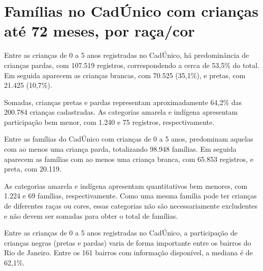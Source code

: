 \section{Famílias no CadÚnico com crianças até 72 meses, por raça/\allowbreak{}cor}


Entre as crianças de 0 a 5 anos registradas no CadÚnico, há predominância de crianças pardas, com 107.519 registros, correspondendo a cerca de 53,5\% do total. Em seguida aparecem as crianças brancas, com 70.525 (35,1\%), e pretas, com 21.425 (10,7\%).

Somadas, crianças pretas e pardas representam aproximadamente 64,2\% das 200.784 crianças cadastradas. As categorias amarela e indígena apresentam participação bem menor, com 1.240 e 75 registros, respectivamente.


Entre as famílias do CadÚnico com crianças de 0 a 5 anos, predominam aquelas com ao menos uma criança parda, totalizando 98.948 famílias. Em seguida aparecem as famílias com ao menos uma criança branca, com 65.853 registros, e preta, com 20.119.

As categorias amarela e indígena apresentam quantitativos bem menores, com 1.224 e 69 famílias, respectivamente. Como uma mesma família pode ter crianças de diferentes raças ou cores, essas categorias não são necessariamente excludentes e não devem ser somadas para obter o total de famílias.


Entre as crianças de 0 a 5 anos registradas no CadÚnico, a participação de crianças negras (pretas e pardas) varia de forma importante entre os bairros do Rio de Janeiro. Entre os 161 bairros com informação disponível, a mediana é de 62,1\%.

